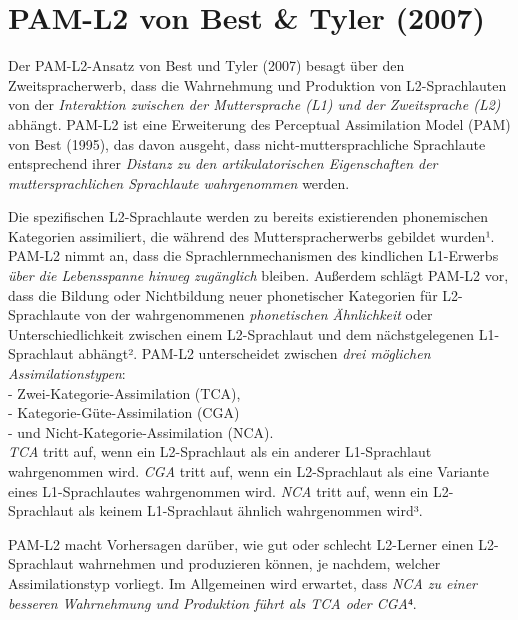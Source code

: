 \documentclass[
  letterpaper,
]{scrbook}
\begin{document}
\hypertarget{pam-l2-von-best-tyler-2007}{%
\section{PAM-L2 von Best \& Tyler
(2007)}\label{pam-l2-von-best-tyler-2007}}

Der PAM-L2-Ansatz von Best und Tyler (2007) besagt über den
Zweitspracherwerb, dass die Wahrnehmung und Produktion von
L2-Sprachlauten von der \emph{Interaktion zwischen der Muttersprache
(L1) und der Zweitsprache (L2)} abhängt. PAM-L2 ist eine Erweiterung des
Perceptual Assimilation Model (PAM) von Best (1995), das davon ausgeht,
dass nicht-muttersprachliche Sprachlaute entsprechend ihrer
\emph{Distanz zu den artikulatorischen Eigenschaften der
muttersprachlichen Sprachlaute wahrgenommen} werden.

Die spezifischen L2-Sprachlaute werden zu bereits existierenden
phonemischen Kategorien assimiliert, die während des Mutterspracherwerbs
gebildet wurden¹. PAM-L2 nimmt an, dass die Sprachlernmechanismen des
kindlichen L1-Erwerbs \emph{über die Lebensspanne hinweg zugänglich}
bleiben. Außerdem schlägt PAM-L2 vor, dass die Bildung oder Nichtbildung
neuer phonetischer Kategorien für L2-Sprachlaute von der wahrgenommenen
\emph{phonetischen Ähnlichkeit} oder Unterschiedlichkeit zwischen einem
L2-Sprachlaut und dem nächstgelegenen L1-Sprachlaut abhängt². PAM-L2
unterscheidet zwischen \emph{drei möglichen Assimilationstypen}:\\
- Zwei-Kategorie-Assimilation (TCA),\\
- Kategorie-Güte-Assimilation (CGA)\\
- und Nicht-Kategorie-Assimilation (NCA).\\
\emph{TCA} tritt auf, wenn ein L2-Sprachlaut als ein anderer
L1-Sprachlaut wahrgenommen wird. \emph{CGA} tritt auf, wenn ein
L2-Sprachlaut als eine Variante eines L1-Sprachlautes wahrgenommen wird.
\emph{NCA} tritt auf, wenn ein L2-Sprachlaut als keinem L1-Sprachlaut
ähnlich wahrgenommen wird³.

PAM-L2 macht Vorhersagen darüber, wie gut oder schlecht L2-Lerner einen
L2-Sprachlaut wahrnehmen und produzieren können, je nachdem, welcher
Assimilationstyp vorliegt. Im Allgemeinen wird erwartet, dass \emph{NCA
zu einer besseren Wahrnehmung und Produktion führt als TCA oder CGA}⁴.
\end{document}
